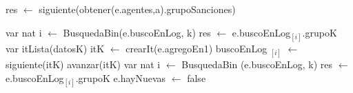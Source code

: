 \begin{algorithm}[H]
\begin{algorithmic}[1]
 
    \State res $\gets$ siguiente(obtener(e.agentes,a).grupoSanciones)
\EndFunction
\end{algorithmic}
\end{algorithm}

\begin{algorithm}[H]
\begin{algorithmic}[1]
 
	 
		 \State var nat i $\gets$ BusquedaBin(e.buscoEnLog, k) 
		 \State res $\gets$ e.buscoEnLog$_{[i]}$.grupoK 
	\Else
		 \State var itLista(datosK) itK $\gets$ crearIt(e.agregoEn1) 
		  
		 	\State buscoEnLog $_{[i]}$ $\gets$ siguiente(itK) 
		 	\State avanzar(itK)
		 \EndWhile
		 \State var nat i $\gets$ BusquedaBin (e.buscoEnLog, k) 
		 \State res $\gets$ e.buscoEnLog$_{[i]}$.grupoK 
		 \State e.hayNuevas $\gets$ false 
	\EndIf
\EndFunction
\end{algorithmic}
\end{algorithm}

